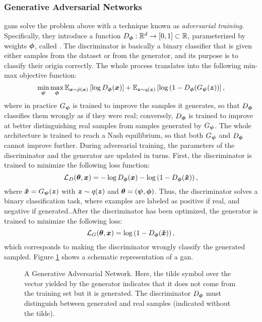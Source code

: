 \subsubsection*{Generative Adversarial Networks}
\glspl{gan} \citep{goodfellow2014gan} solve the problem above with a technique known as \emph{adversarial training}. Specifically, they introduce a function $D_{\boldsymbol{\phi}}: \mathbb{R}^d \rightarrow [0,1] \subset \mathbb{R}$, parameterized by weights $\boldsymbol{\phi}$, called . The discriminator is basically a binary classifier that is given either samples from the dataset or from the generator, and its purpose is to classify their origin correctly. The whole process translates into the following min-max objective function:
$$\min_{\GenParam} \max_{\DiscParam} \Expectation{\Vector{x} \sim \hat{p}(\Vector{x})}{\log \Discriminator(\Vector{x})} + \Expectation{\Vector{z} \sim q(\Vector{z})}{\log\Par{1-\Discriminator(\Generator(\Vector{z})}},$$
where in practice $G_{\boldsymbol{\psi}}$ is trained to improve the samples it generates, so that $D_{\boldsymbol{\phi}}$ classifies them wrongly as if they were real; conversely, $D_{\boldsymbol{\phi}}$ is trained to improve at better distinguishing real samples from samples generated by $G_{\boldsymbol{\psi}}$. The whole architecture is trained to reach a Nash equilibrium, so that both $G_{\boldsymbol{\psi}}$ and $D_{\boldsymbol{\phi}}$ cannot improve further. During adversarial training, the parameters of the discriminator and the generator are updated in turns. First, the discriminator is trained to minimize the following loss function:
$$\Loss_D(\Param, \Vector{x}) =  -\log \Discriminator(\Vector{x}) -\log\Par{1-\Discriminator(\Vector{\tilde{x}})},$$
where $\Vector{\tilde{x}} = \Generator(\Vector{z})$ with $\Vector{z} \sim q(\Vector{z})$ and $\boldsymbol{\theta} = (\boldsymbol{\psi}, \boldsymbol{\phi})$. Thus, the discriminator solves a binary classification task, where examples are labeled as positive if real, and negative if generated..After the discriminator has been optimized, the generator is trained to minimize the following loss:
$$\Loss_G(\Param, \Vector{x}) = \log\Par{1-\Discriminator(\Vector{\tilde{x}})},$$
which corresponds to making the discriminator wrongly classify the generated sampled. Figure \ref{fig:gan} shows a schematic representation of a \gls{gan}.
\begin{figure*}[h!]
    \centering
    \resizebox{.6\textwidth}{!}{}
    \caption{A Generative Adversarial Network. Here, the tilde symbol over the vector yielded by the generator indicates that it does not come from the training set but it is generated. The discriminator $D_{\boldsymbol{\phi}}$ must distinguish between generated and real samples (indicated without the tilde).}
    \label{fig:gan}
\end{figure*}
